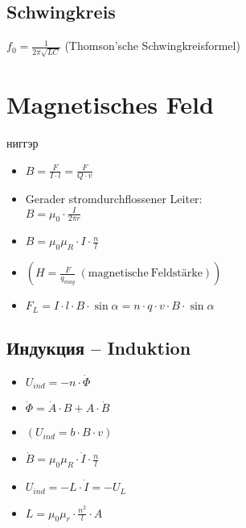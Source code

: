 \documentclass[paper = a4, twocolumn]{scrartcl}
\begin{document}
\subsection{Schwingkreis}
\( f_0 = \frac{1}{2 \pi \sqrt{LC}} \) (Thomson’sche Schwingkreisformel)

\section{Magnetisches Feld}
ниггэр
\begin{itemize}
\item
	\( B = \frac{F}{I \cdot l} = \frac{F}{Q \cdot v} \)
\item
	Gerader stromdurchflossener Leiter:\\
	\( B = \mu_0 \cdot \frac{I}{2 \pi r} \)
\item
	\( B = \mu_0 \mu_R \cdot I \cdot \frac{n}{l} \)
\item
	\( \left( H = \frac{F}{q_{mag}}\ \mathrm{(magnetische\ Feldstärke)} \right)
	\)
\item
	\( F_L = I \cdot l \cdot B \cdot \sin \alpha = n \cdot q \cdot v \cdot B
	\cdot \sin \alpha \)
\end{itemize}

\subsection{Индукция – Induktion}
\begin{itemize}
\item
	\( U_{ind} = -n \cdot \dot{\Phi} \)
\item
	\( \dot{\Phi} = \dot{A} \cdot B + A \cdot \dot{B} \)
\item
	\(\left(  U_{ind} = b \cdot B \cdot v \right)\)
\item
	\( \dot{B} = \mu_0 \mu_R \cdot \dot{I} \cdot \frac{n}{l} \)
\item
	\( U_{ind} = -L \cdot \dot{I} = -U_L \)
\item
	\( L = \mu_0 \mu_r \cdot \frac{n^2}{l} \cdot A \)
\end{itemize}
\end{document}
